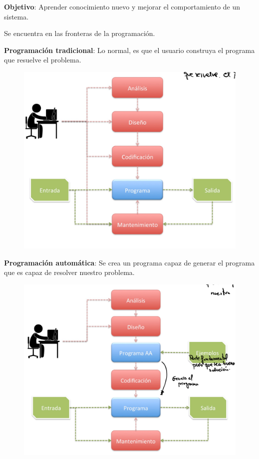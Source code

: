 \documentclass[12pt, twoside, openright]{report} %
\begin{document}
\textbf{Objetivo}: Aprender conocimiento nuevo y mejorar el comportamiento de un sistema.

Se encuentra en las fronteras de la programación.

\textbf{Programación tradicional}: Lo normal, es que el usuario construya el programa que resuelve el problema.

\begin{figure}[H]
	{\includegraphics[scale=.15]{Untitled.png}}
\end{figure}

\textbf{Programación automática}: Se crea un programa capaz de generar
el programa que es capaz de resolver nuestro problema.

\begin{figure}[H]
	{\includegraphics[scale=.15]{Untitled 1.png}}
\end{figure}
\end{document}
